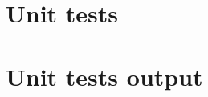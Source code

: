 \begin{scriptsize}
\begin{ttfamily}

\end{ttfamily}
\end{scriptsize}

\section{Unit tests}

\begin{scriptsize}
\begin{ttfamily}

\end{ttfamily}
\end{scriptsize}

\section{Unit tests output}

\begin{scriptsize}
\begin{ttfamily}

\end{ttfamily}
\end{scriptsize}

